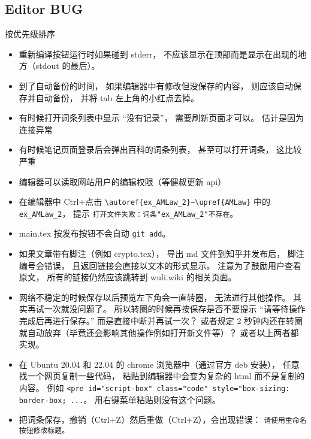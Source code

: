 \subsection{Editor BUG}
按优先级排序
\begin{itemize}
\item 重新编译按钮运行时如果碰到 stderr， 不应该显示在顶部而是显示在出现的地方（stdout 的最后）。

\item 到了自动备份的时间， 如果编辑器中有修改但没保存的内容， 则应该自动保存并自动备份， 并将 tab 左上角的小红点去掉。

\item 有时候打开词条列表中显示 “没有记录”， 需要刷新页面才可以。 估计是因为连接异常

\item 有时候笔记页面登录后会弹出百科的词条列表， 甚至可以打开词条， 这比较严重

\item 编辑器可以读取网站用户的编辑权限（等健叔更新 api）

\item 在编辑器中 Ctrl+点击 \verb|\autoref{ex_AMLaw_2}~\upref{AMLaw}| 中的 \verb|ex_AMLaw_2|， 提示 \verb|打开文件失败：词条"ex_AMLaw_2"不存在|。

\item main.tex 按发布按钮不会自动 \verb|git add|。

\item 如果文章带有脚注（例如 crypto.tex）， 导出 md 文件到知乎并发布后， 脚注编号会错误， 且返回链接会直接以文本的形式显示。 注意为了鼓励用户查看原文， 所有的链接仍然应该跳转到 wuli.wiki 的相关页面。

\item 网络不稳定的时候保存以后预览左下角会一直转圈， 无法进行其他操作。 其实再试一次就没问题了。 所以转圈的时候再按保存是否不要提示 “请等待操作完成后再进行保存。” 而是直接中断并再试一次？ 或者规定 2 秒钟内还在转圈就自动放弃（毕竟还会影响其他操作例如打开新文件等）？ 或者以上两者都实现。

\item 在 Ubuntu 20.04 和 22.04 的 chrome 浏览器中（通过官方 deb 安装）， 任意找一个网页复制一些代码， 粘贴到编辑器中会变为复杂的 html 而不是复制的内容。 例如 \verb|<pre id="script-box" class="code" style="box-sizing: border-box; ...|。 用右键菜单粘贴则没有这个问题。

\item 把词条保存，撤销（Ctrl+Z）然后重做（Ctrl+Z），会出现错误： \verb|请使用重命名按钮修改标题。|


\end{itemize}
